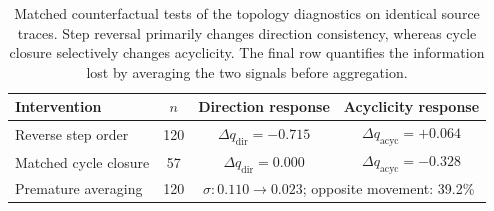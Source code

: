 \begin{table}[!ht]
\centering
\caption{Matched counterfactual tests of the topology diagnostics on identical source traces. Step reversal primarily changes direction consistency, whereas cycle closure selectively changes acyclicity. The final row quantifies the information lost by averaging the two signals before aggregation.}
\label{tab:topology_counterfactuals}
\small
\setlength{\tabcolsep}{5.0pt}
\renewcommand{\arraystretch}{1.10}
\begin{tabularx}{\textwidth}{@{}>{\raggedright\arraybackslash}X ccc@{}}
\toprule
\textbf{Intervention} & \textbf{$n$} & \textbf{Direction response} & \textbf{Acyclicity response} \\
\midrule
Reverse step order & 120 & $\Delta q_{\mathrm{dir}}=-0.715$ & $\Delta q_{\mathrm{acyc}}=+0.064$ \\
Matched cycle closure & 57 & $\Delta q_{\mathrm{dir}}=0.000$ & $\Delta q_{\mathrm{acyc}}=-0.328$ \\
\midrule
Premature averaging & 120 & \multicolumn{2}{c}{$\sigma: 0.110 \rightarrow 0.023$; opposite movement: 39.2\%} \\
\bottomrule
\end{tabularx}
\end{table}
